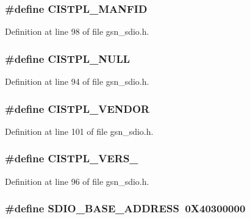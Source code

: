 \hypertarget{a00584_a254d188fdc3d26e69e7a9cd16801bbb0}{
\subsubsection[{CISTPL\_\-MANFID}]{\setlength{\rightskip}{0pt plus 5cm}\#define CISTPL\_\-MANFID}}
\label{a00584_a254d188fdc3d26e69e7a9cd16801bbb0}


Definition at line 98 of file gsn\_\-sdio.h.

\hypertarget{a00584_a63323d48f25522cf360323ea211adb8f}{
\subsubsection[{CISTPL\_\-NULL}]{\setlength{\rightskip}{0pt plus 5cm}\#define CISTPL\_\-NULL}}
\label{a00584_a63323d48f25522cf360323ea211adb8f}


Definition at line 94 of file gsn\_\-sdio.h.

\hypertarget{a00584_a3e176ed7d370976c08e92ec312abc459}{
\subsubsection[{CISTPL\_\-VENDOR}]{\setlength{\rightskip}{0pt plus 5cm}\#define CISTPL\_\-VENDOR}}
\label{a00584_a3e176ed7d370976c08e92ec312abc459}


Definition at line 101 of file gsn\_\-sdio.h.

\hypertarget{a00584_a35ce88e01940df49789578a0a8a17d60}{
\subsubsection[{CISTPL\_\-VERS\_\-1}]{\setlength{\rightskip}{0pt plus 5cm}\#define CISTPL\_\-VERS\_}}
\label{a00584_a35ce88e01940df49789578a0a8a17d60}


Definition at line 96 of file gsn\_\-sdio.h.

\hypertarget{a00584_ae85da24c93589d650ff798c2471a16ca}{
\subsubsection[{SDIO\_\-BASE\_\-ADDRESS}]{\setlength{\rightskip}{0pt plus 5cm}\#define SDIO\_\-BASE\_\-ADDRESS~0X40300000}}
\label{a00584_ae85da24c93589d650ff798c2471a16ca}


